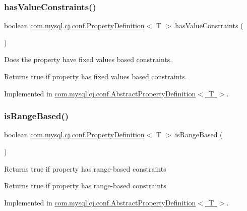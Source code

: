 \subsubsection{\texorpdfstring{has\+Value\+Constraints()}{hasValueConstraints()}}
{\footnotesize\ttfamily boolean \mbox{\hyperlink{interfacecom_1_1mysql_1_1cj_1_1conf_1_1_property_definition}{com.\+mysql.\+cj.\+conf.\+Property\+Definition}}$<$ T $>$.has\+Value\+Constraints (\begin{DoxyParamCaption}{ }\end{DoxyParamCaption})}

Does the property have fixed values based constraints.

\begin{DoxyReturn}{Returns}
true if property has fixed values based constraints. 
\end{DoxyReturn}


Implemented in \mbox{\hyperlink{classcom_1_1mysql_1_1cj_1_1conf_1_1_abstract_property_definition_a2a34114907269a32b04a433c42982355}{com.\+mysql.\+cj.\+conf.\+Abstract\+Property\+Definition$<$ T $>$}}.

\mbox{\label{interfacecom_1_1mysql_1_1cj_1_1conf_1_1_property_definition_a2bf2cf38bb5d0aad4d150cda93042052}} 
\subsubsection{\texorpdfstring{is\+Range\+Based()}{isRangeBased()}}
{\footnotesize\ttfamily boolean \mbox{\hyperlink{interfacecom_1_1mysql_1_1cj_1_1conf_1_1_property_definition}{com.\+mysql.\+cj.\+conf.\+Property\+Definition}}$<$ T $>$.is\+Range\+Based (\begin{DoxyParamCaption}{ }\end{DoxyParamCaption})}

Returns true if property has range-\/based constraints

\begin{DoxyReturn}{Returns}
true if property has range-\/based constraints 
\end{DoxyReturn}


Implemented in \mbox{\hyperlink{classcom_1_1mysql_1_1cj_1_1conf_1_1_abstract_property_definition_a9395e63d016a2cf36bd19860dc160a29}{com.\+mysql.\+cj.\+conf.\+Abstract\+Property\+Definition$<$ T $>$}}.

